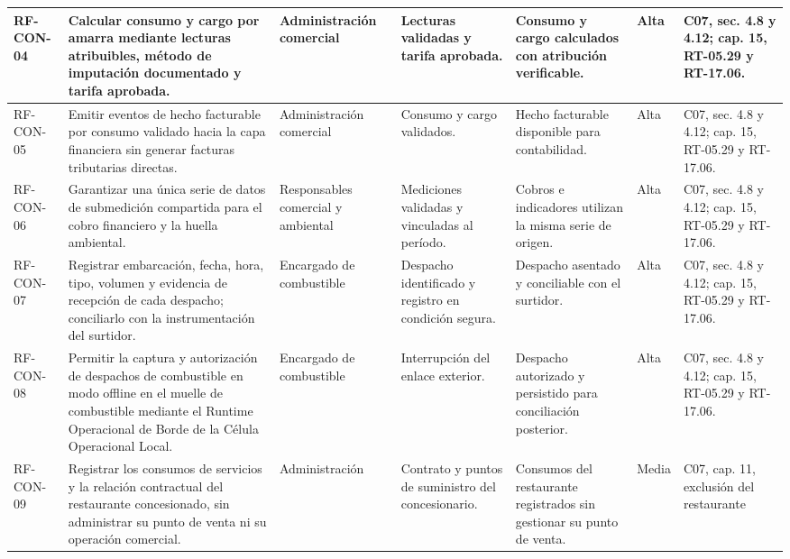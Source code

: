 \begin{longtable}{|L{0.080645\AnchoTablaAnexo}|L{0.262097\AnchoTablaAnexo}|L{0.100806\AnchoTablaAnexo}|L{0.145161\AnchoTablaAnexo}|L{0.173387\AnchoTablaAnexo}|L{0.060484\AnchoTablaAnexo}|L{0.177420\AnchoTablaAnexo}|}
RF-\allowbreak{}CON-\allowbreak{}04 &
Calcular consumo y cargo por amarra mediante lecturas atribuibles, método de imputación documentado y tarifa aprobada. &
Administración comercial &
Lecturas validadas y tarifa aprobada. &
Consumo y cargo calculados con atribución verificable. &
Alta &
C07, sec. 4.8 y 4.12; cap. 15, RT-05.29 y RT-17.06. \\ \hline

RF-\allowbreak{}CON-\allowbreak{}05 &
Emitir eventos de hecho facturable por consumo validado hacia la capa financiera sin generar facturas tributarias directas. &
Administración comercial &
Consumo y cargo validados. &
Hecho facturable disponible para contabilidad. &
Alta &
C07, sec. 4.8 y 4.12; cap. 15, RT-05.29 y RT-17.06. \\ \hline

RF-\allowbreak{}CON-\allowbreak{}06 &
Garantizar una única serie de datos de submedición compartida para el cobro financiero y la huella ambiental. &
Responsables comercial y ambiental &
Mediciones validadas y vinculadas al período. &
Cobros e indicadores utilizan la misma serie de origen. &
Alta &
C07, sec. 4.8 y 4.12; cap. 15, RT-05.29 y RT-17.06. \\ \hline

RF-\allowbreak{}CON-\allowbreak{}07 &
Registrar embarcación, fecha, hora, tipo, volumen y evidencia de recepción de cada despacho; conciliarlo con la instrumentación del surtidor. &
Encargado de combustible &
Despacho identificado y registro en condición segura. &
Despacho asentado y conciliable con el surtidor. &
Alta &
C07, sec. 4.8 y 4.12; cap. 15, RT-05.29 y RT-17.06. \\ \hline

RF-\allowbreak{}CON-\allowbreak{}08 &
Permitir la captura y autorización de despachos de combustible en modo offline en el muelle de combustible mediante el Runtime Operacional de Borde de la Célula Operacional Local. &
Encargado de combustible &
Interrupción del enlace exterior. &
Despacho autorizado y persistido para conciliación posterior. &
Alta &
C07, sec. 4.8 y 4.12; cap. 15, RT-05.29 y RT-17.06. \\ \hline

RF-\allowbreak{}CON-\allowbreak{}09 &
Registrar los consumos de servicios y la relación contractual del restaurante concesionado, sin administrar su punto de venta ni su operación comercial. &
Administración &
Contrato y puntos de suministro del concesionario. &
Consumos del restaurante registrados sin gestionar su punto de venta. &
Media &
C07, cap. 11, exclusión del restaurante \\ \hline

\end{longtable}

